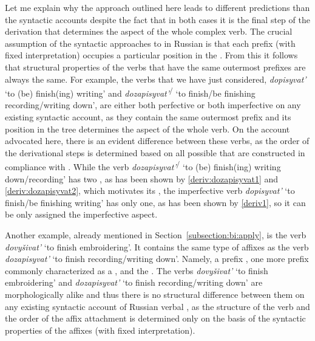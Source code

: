Let me explain why the approach outlined here leads to different predictions than the syntactic accounts despite the fact that in both cases it is the final step of the derivation that determines the aspect of the whole complex verb. The crucial assumption of the syntactic approaches to  in Russian is that each prefix (with fixed interpretation) occupies a particular position in the . From this it follows that structural properties of the verbs that have the same outermost prefixes are always the same. For example, the verbs that we have just considered, \textit{dopisyvat'}\textsuperscript{\IPF} `to (be) finish(ing) writing' and \textit{dozapisyvat'}\textsuperscript{\IPF\slash\PF} `to finish/be finishing recording/writing down', are either both perfective or both imperfective on any existing syntactic  account, as they contain the same outermost prefix  and its position in the tree determines the aspect of the whole verb. On the account advocated here, there is an evident difference between these verbs, as the order of the derivational steps is determined based on all possible  that are constructed in compliance with . While the verb \textit{dozapisyvat'}\textsuperscript{\IPF\slash\PF} `to (be) finish(ing) writing down/recording' has two , as has been shown by \ref{deriv:dozapisyvat1} and \ref{deriv:dozapisyvat2}, which motivates its , the imperfective verb \textit{dopisyvat'}\textsuperscript{\IPF} `to finish/be finishing writing' has only one, as has been shown by \ref{deriv1}, so it can be only assigned the imperfective aspect.

Another example, already mentioned in Section~\ref{subsection:bi:apply}, is the verb \textit{dovy\v{s}ivat'} `to finish embroidering'. It contains the same type of affixes as the verb \textit{dozapisyvat'} `to finish recording/writing down'. Namely, a  prefix , one more prefix commonly characterized as a , and the . The verbs \textit{dovy\v{s}ivat'} `to finish embroidering' and \textit{dozapisyvat'} `to finish recording/writing down' are morphologically alike and thus there is no structural difference between them on any existing syntactic account of Russian verbal , as the structure of the verb and the order of the affix attachment is determined only on the basis of the syntactic properties of the affixes (with fixed interpretation).\largerpage
 
